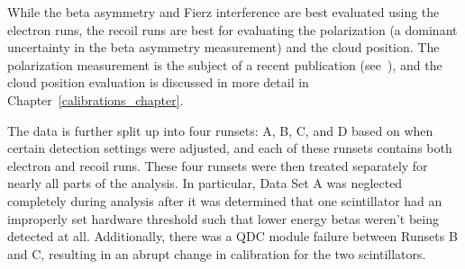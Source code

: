 While the beta asymmetry and Fierz interference are best evaluated using the electron runs, the recoil runs are best for evaluating the polarization (a dominant uncertainty in the beta asymmetry measurement) and the cloud position.  The polarization measurement is the subject of a recent publication (see~\cite{ben_OP}), and the cloud position evaluation is discussed in more detail in Chapter~\ref{calibrations_chapter}.

The data is further split up into four runsets:  A, B, C, and D based on when certain detection settings were adjusted, and each of these runsets contains both electron and recoil runs.  These four runsets were then treated separately for nearly all parts of the analysis.  In particular, Data Set A was neglected completely during analysis after it was determined that one scintillator had an improperly set hardware threshold such that lower energy betas weren't being detected at all.  Additionally, there was a QDC module failure between Runsets B and C, resulting in an abrupt change in calibration for the two scintillators.  



%



